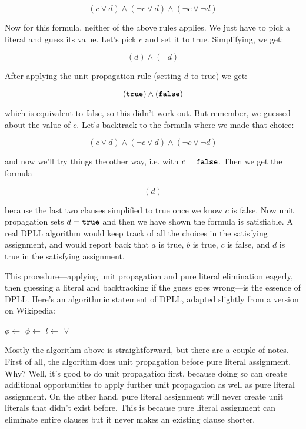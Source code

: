 \documentclass[11pt]{article}
\begin{document}
\[
(c \lor d) \land (\lnot c \lor d) \land (\lnot c \lor \lnot d)
\]

Now for this formula, neither of the above rules applies. We just have to pick a
literal and guess its value. Let's pick $c$ and set it to true. Simplifying, we
get:

\[
(d) \land (\lnot d)
\]

After applying the unit propagation rule (setting $d$ to true) we get:

\[
(\texttt{\textbf{true}}) \land (\texttt{\textbf{false}})
\]

which is equivalent to false, so this didn't work out. But remember, we guessed
about the value of $c$. Let's backtrack to the formula where we made that
choice:

\[
(c \lor d) \land (\lnot c \lor d) \land (\lnot c \lor \lnot d)
\]

and now we'll try things the other way, i.e. with $c = \texttt{\textbf{false}}$.  Then we get the formula

\[
(d)
\]

because the last two clauses simplified to true once we know $c$ is false. Now
unit propagation sets $d = \texttt{\textbf{true}}$ and then we have shown the formula is
satisfiable. A real DPLL algorithm would keep track of all the choices in the
satisfying assignment, and would report back that $a$ is true, $b$ is true, $c$
is false, and $d$ is true in the satisfying assignment.

This procedure---applying unit propagation and pure literal elimination eagerly,
then guessing a literal and backtracking if the guess goes wrong---is the
essence of DPLL. Here's an algorithmic statement of DPLL, adapted slightly from
a version on Wikipedia:

\begin{algorithmic}

    \If{$\phi = \ltrue$}
        \State \Return \ltrue
    \EndIf
        \State \Return \lfalse
    \EndIf
        \State $\phi \gets$ 
    \EndFor
        \State $\phi \gets$ 
    \EndFor
    \State $l \gets$ 
    \State \Return {} $\lor$  
\EndFunction

\end{algorithmic}

Mostly the algorithm above is straightforward, but there are a couple of notes.
First of all, the algorithm does unit propagation before pure literal
assignment. Why? Well, it's good to do unit propagation first, because doing so
can create additional opportunities to apply further unit propagation as well as
pure literal assignment. On the other hand, pure literal assignment will never
create unit literals that didn't exist before. This is because pure literal
assignment can eliminate entire clauses but it never makes an existing clause
shorter.
\end{document}
